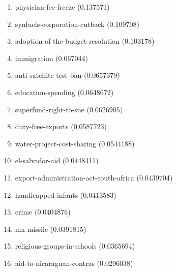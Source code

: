 \begin{enumerate}
\item physician-fee-freeze (0.137571)
\item synfuels-corporation-cutback (0.109708)
\item adoption-of-the-budget-resolution (0.103178)
\item immigration (0.067044)
\item anti-satellite-test-ban (0.0657379)
\item education-spending (0.0648672)
\item superfund-right-to-sue (0.0626905)
\item duty-free-exports (0.0587723)
\item water-project-cost-sharing (0.0544188)
\item el-salvador-aid (0.0448411)
\item export-administration-act-south-africa (0.0439704)
\item handicapped-infants (0.0413583)
\item crime (0.0404876)
\item mx-missile (0.0391815)
\item religious-groups-in-schools (0.0365694)
\item aid-to-nicaraguan-contras (0.0296038)
\end{enumerate}